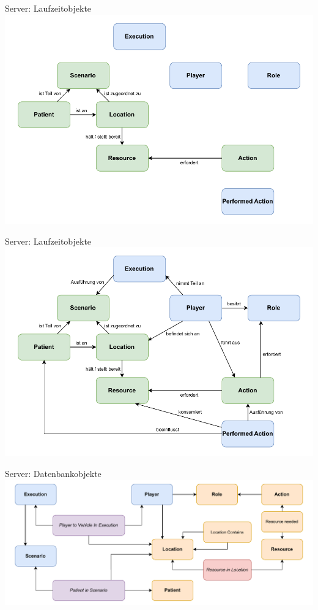 \begin{frame}{Server: Laufzeitobjekte}
	\centering
	\includegraphics[height=.9\textheight]{images/server/laufzeit_objekte_3.pdf}
\end{frame}

\begin{frame}{Server: Laufzeitobjekte}
	\centering
	\includegraphics[height=.9\textheight]{images/server/laufzeit_objekte.pdf}
\end{frame}


\begin{frame}{Server: Datenbankobjekte}
	\centering
	\includegraphics[width=\textwidth]{images/server/datenbank_objekte.pdf}
\end{frame}
